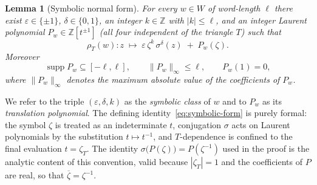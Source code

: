 \documentclass[11pt]{article}
\theoremstyle{plain}
\newtheorem{lemma}[theorem]{Lemma}
\theoremstyle{definition}
\theoremstyle{remark}
\begin{document}
\begin{lemma}[Symbolic normal form]
\label{lem:symbolic-form}
For every $w \in W$ of word-length $\ell$ there exist
$\varepsilon \in \{\pm 1\}$, $\delta \in \{0,1\}$, an integer
$k \in \mathbb{Z}$ with $|k| \le \ell$, and an integer Laurent polynomial
$P_w \in \mathbb{Z}[t^{\pm 1}]$ (all four \emph{independent of the
triangle $T$}) such that
\begin{equation}
\label{eq:symbolic-form}
\rho_T(w)\colon z \;\longmapsto\;
\varepsilon\, \zeta^{k}\, \sigma^{\delta}(z) \;+\; P_w(\zeta).
\end{equation}
Moreover
\[
\operatorname{supp} P_w \subseteq [-\ell, \ell],
\qquad
\|P_w\|_\infty \le \ell,
\qquad
P_w(1) = 0,
\]
where $\|P_w\|_\infty$ denotes the maximum absolute value of the
coefficients of $P_w$.
\end{lemma}

We refer to the triple $(\varepsilon, \delta, k)$ as the \emph{symbolic
class} of $w$ and to $P_w$ as its \emph{translation polynomial}. The
defining identity~\eqref{eq:symbolic-form} is purely formal: the symbol
$\zeta$ is treated as an indeterminate $t$, conjugation $\sigma$ acts on
Laurent polynomials by the substitution $t \mapsto t^{-1}$, and
$T$-dependence is confined to the final evaluation $t = \zeta_T$. The
identity $\sigma\bigl(P(\zeta)\bigr) = P(\zeta^{-1})$ used in the proof is
the analytic content of this convention, valid because $|\zeta_T| = 1$ and
the coefficients of $P$ are real, so that $\overline{\zeta} = \zeta^{-1}$.
\end{document}
